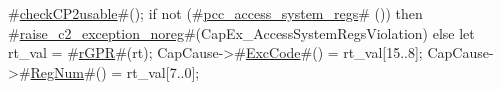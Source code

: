 #\hyperref[sailMIPSzcheckCP2usable]{checkCP2usable}#();
if not (#\hyperref[sailMIPSzpcczyaccesszysystemzyregs]{pcc\_access\_system\_regs}# ()) then
  #\hyperref[sailMIPSzraisezyc2zyexceptionzynoreg]{raise\_c2\_exception\_noreg}#(CapEx_AccessSystemRegsViolation)
else
{
  let rt_val = #\hyperref[sailMIPSzrGPR]{rGPR}#(rt);
  CapCause->#\hyperref[sailMIPSzExcCode]{ExcCode}#() = rt_val[15..8];
  CapCause->#\hyperref[sailMIPSzRegNum]{RegNum}#()  = rt_val[7..0];
}
